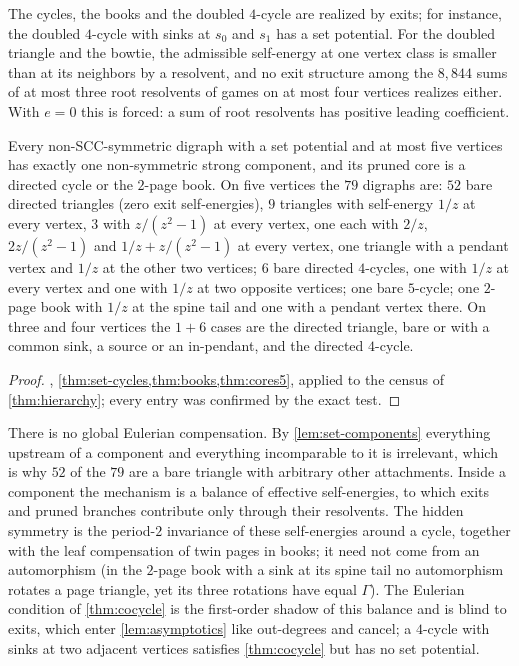 The cycles, the books and the doubled $4$-cycle are realized by exits; for instance, the doubled $4$-cycle with sinks at $s_0$ and $s_1$ has a set potential. For the doubled triangle and the bowtie, the admissible self-energy at one vertex class is smaller than at its neighbors by a resolvent, and no exit structure among the $8{,}844$ sums of at most three root resolvents of games on at most four vertices realizes either. With $e=0$ this is forced: a sum of root resolvents has positive leading coefficient.

\begin{corollary}\label{cor:census5}
Every non-SCC-symmetric digraph with a set potential and at most five vertices has exactly one non-symmetric strong component, and its pruned core is a directed cycle or the $2$-page book. On five vertices the $79$ digraphs are: $52$ bare directed triangles (zero exit self-energies), $9$ triangles with self-energy $1/z$ at every vertex, $3$ with $z/(z^2-1)$ at every vertex, one each with $2/z$, $2z/(z^2-1)$ and $1/z+z/(z^2-1)$ at every vertex, one triangle with a pendant vertex and $1/z$ at the other two vertices; $6$ bare directed $4$-cycles, one with $1/z$ at every vertex and one with $1/z$ at two opposite vertices; one bare $5$-cycle; one $2$-page book with $1/z$ at the spine tail and one with a pendant vertex there. On three and four vertices the $1+6$ cases are the directed triangle, bare or with a common sink, a source or an in-pendant, and the directed $4$-cycle.
\end{corollary}
\begin{proof}
, \cref{thm:set-cycles,thm:books,thm:cores5}, applied to the census of \cref{thm:hierarchy}; every entry was confirmed by the exact test.
\end{proof}

\begin{remark}\label{rem:mechanism}
There is no global Eulerian compensation. By \cref{lem:set-components} everything upstream of a component and everything incomparable to it is irrelevant, which is why $52$ of the $79$ are a bare triangle with arbitrary other attachments. Inside a component the mechanism is a balance of effective self-energies, to which exits and pruned branches contribute only through their resolvents. The hidden symmetry is the period-$2$ invariance of these self-energies around a cycle, together with the leaf compensation of twin pages in books; it need not come from an automorphism (in the $2$-page book with a sink at its spine tail no automorphism rotates a page triangle, yet its three rotations have equal $\Gamma$). The Eulerian condition of \cref{thm:cocycle} is the first-order shadow of this balance and is blind to exits, which enter \cref{lem:asymptotics} like out-degrees and cancel; a $4$-cycle with sinks at two adjacent vertices satisfies \cref{thm:cocycle} but has no set potential.
\end{remark}


